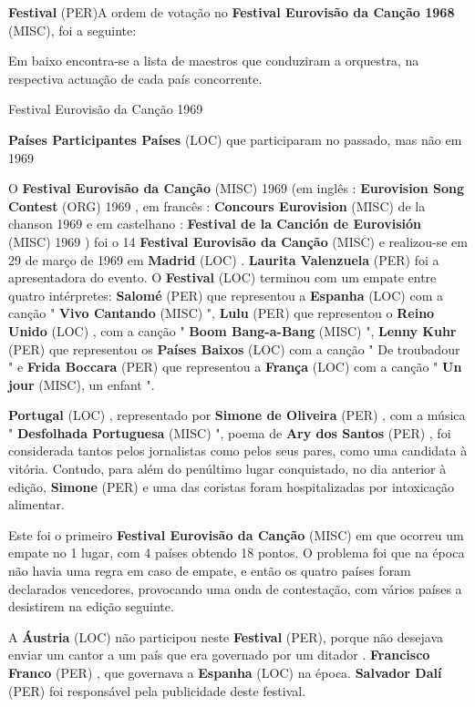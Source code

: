 \documentclass[12pt,a4paper]{article}
\begin{document}
\textbf{Festival} (PER)A ordem de votação no \textbf{Festival Eurovisão da Canção 1968} (MISC), foi a seguinte:

Em baixo encontra-se a lista de maestros que conduziram a orquestra, na respectiva actuação de cada país concorrente.



Festival Eurovisão da Canção 1969



\textbf{Países Participantes Países} (LOC) que participaram no passado, mas não em 1969

O \textbf{Festival Eurovisão da Canção} (MISC) 1969 (em inglês : \textbf{Eurovision Song Contest} (ORG) 1969 , em francês : \textbf{Concours Eurovision} (MISC) de la chanson 1969 e em castelhano : \textbf{Festival de la Canción de Eurovisión} (MISC) 1969 ) foi o 14 \textbf{Festival Eurovisão da Canção} (MISC) e realizou-se em 29 de março de 1969 em \textbf{Madrid} (LOC) . \textbf{Laurita Valenzuela} (PER) foi a apresentadora do evento. O \textbf{Festival} (LOC) terminou com um empate entre quatro intérpretes: \textbf{Salomé} (PER) que representou a \textbf{Espanha} (LOC) com a canção " \textbf{Vivo Cantando} (MISC) ", \textbf{Lulu} (PER) que representou o \textbf{Reino Unido} (LOC) , com a canção " \textbf{Boom Bang-a-Bang} (MISC) ", \textbf{Lenny Kuhr} (PER) que representou os \textbf{Países Baixos} (LOC) com a canção " De troubadour " e \textbf{Frida Boccara} (PER) que representou a \textbf{França} (LOC) com a canção " \textbf{Un jour} (MISC), un enfant ".

\textbf{Portugal} (LOC) , representado por \textbf{Simone de Oliveira} (PER) , com a música " \textbf{Desfolhada Portuguesa} (MISC) ", poema de \textbf{Ary dos Santos} (PER) , foi considerada tantos pelos jornalistas como pelos seus pares, como uma candidata à vitória. Contudo, para além do penúltimo lugar conquistado, no dia anterior à edição, \textbf{Simone} (PER) e uma das coristas foram hospitalizadas por intoxicação alimentar.

Este foi o primeiro \textbf{Festival Eurovisão da Canção} (MISC) em que ocorreu um empate no 1 lugar, com 4 países obtendo 18 pontos. O problema foi que na época não havia uma regra em caso de empate, e então os quatro países foram declarados vencedores, provocando uma onda de contestação, com vários países a desistirem na edição seguinte.

A \textbf{Áustria} (LOC) não participou neste \textbf{Festival} (PER), porque não desejava enviar um cantor a um país que era governado por um ditador . \textbf{Francisco Franco} (PER) , que governava a \textbf{Espanha} (LOC) na época. \textbf{Salvador Dalí} (PER) foi responsável pela publicidade deste festival.
\end{document}
